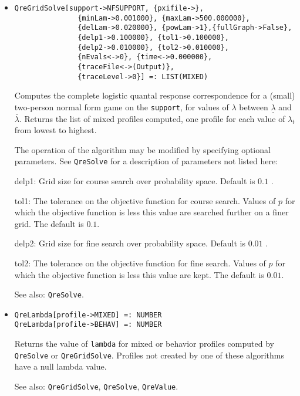 \begin{itemize}

\item{}
\protect \large \begin{verbatim}
QreGridSolve[support->NFSUPPORT, {pxifile->}, 
               {minLam->0.001000}, {maxLam->500.000000}, 
               {delLam->0.020000}, {powLam->1},{fullGraph->False}, 
               {delp1->0.100000}, {tol1->0.100000}, 
               {delp2->0.010000}, {tol2->0.010000}, 
               {nEvals<->0}, {time<->0.000000}, 
               {traceFile<->(Output)}, 
               {traceLevel->0}] =: LIST(MIXED) 
\end{verbatim}\normalsize

\bd
Computes the complete logistic quantal response correspondence for
a (small) two-person normal form game on the \verb+support+, for values of
$\lambda$ between $\underline{\lambda}$ and $\bar{\lambda}.$ Returns
the list of mixed profiles computed, one profile for each value of
$\lambda_t$ from lowest to highest.

The operation of the algorithm may be modified by specifying optional
parameters.  See \verb+QreSolve+ for a description of parameters
not listed here:
\bd
\item
[delp1:] Grid size for course search over probability space.  Default
is $0.1$ .
\item
[tol1:] The tolerance on the objective function for course search.
Values of $p$ for which the objective function is less this value are
searched further on a finer grid.  The default is $0.1$.
\item
[delp2:] Grid size for fine search over probability space.  Default is
$0.01$ .
\item
[tol2:] The tolerance on the objective function for fine search.
Values of $p$ for which the objective function is less this value are
kept.  The default is $0.01$.  
\ed
\item [See also:] \verb+QreSolve+.
\ed

\item{}
\protect \large \begin{verbatim}
QreLambda[profile->MIXED] =: NUMBER 
QreLambda[profile->BEHAV] =: NUMBER 
\end{verbatim}\normalsize

\bd
Returns the value of \verb+lambda+ for mixed or behavior profiles
computed by \verb+QreSolve+ or \verb+QreGridSolve+.  Profiles not
created by one of these algorithms have a null lambda value.
\item
[See also:] \verb+QreGridSolve+, \verb+QreSolve+, \verb+QreValue+.
\ed


\end{itemize}

